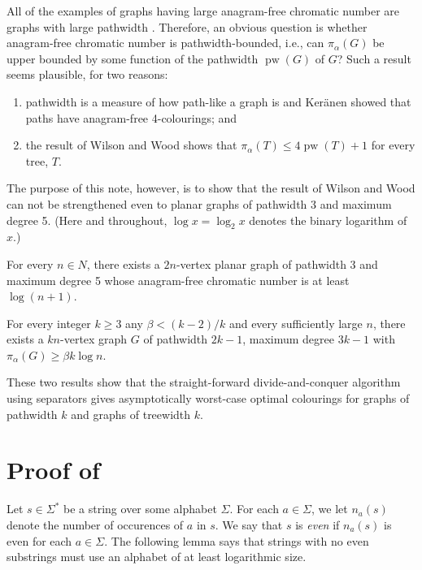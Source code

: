 \documentclass{patmorin}
\DeclareMathOperator{\pw}{pw}
\begin{document}
All of the examples of graphs having large anagram-free chromatic
number are graphs with large pathwidth \cite{robertson.seymour:graph}.  Therefore, an obvious question
is whether anagram-free chromatic number is pathwidth-bounded, i.e.,
can $\pi_\alpha(G)$ be upper bounded by some function of the pathwidth
$\pw(G)$ of $G$?  Such a result seems plausible, for two reasons:
\begin{enumerate}
\item pathwidth is a measure of how path-like a graph
is and Ker\"anen showed that paths have anagram-free 4-colourings; and
\item the result of Wilson and Wood \cite{wilson.wood:anagram-free} shows that $\pi_\alpha(T)\le 4\pw(T)+1$
for every tree, $T$. 
\end{enumerate}
The purpose of this note, however, is to show that the result of Wilson
and Wood can not be strengthened even to planar graphs of pathwidth 3
and maximum degree 5. (Here and throughout, $\log x=\log_2 x$ denotes the binary logarithm of $x$.)

\begin{thm}
  For every $n\in N$, there exists a $2n$-vertex planar graph of
  pathwidth 3 and maximum degree 5 whose anagram-free chromatic number
  is at least $\log(n+1)$.
\end{thm}


\begin{thm}
  For every integer $k\ge 3$ any $\beta < (k-2)/k$ and every sufficiently
  large $n$, there exists a $kn$-vertex graph $G$ of pathwidth $2k-1$,
  maximum degree $3k-1$ with $\pi_\alpha(G)\ge \beta k\log n$.
\end{thm}

These two results show that the straight-forward divide-and-conquer algorithm using separators gives asymptotically worst-case optimal colourings for graphs of pathwidth $k$ and graphs of treewidth $k$.

\section{Proof of }

Let $s\in\Sigma^*$ be a string over some alphabet $\Sigma$.  For each
$a\in\Sigma$, we let $n_a(s)$ denote the number of occurences of $a$
in $s$.  We say that $s$ is \emph{even} if $n_a(s)$ is even for each
$a\in\Sigma$.  The following lemma says that strings with no even
substrings must use an alphabet of at least logarithmic size.
\end{document}
